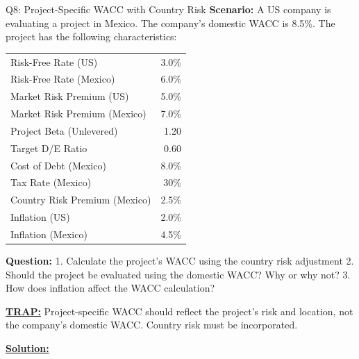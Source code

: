 \documentclass{beamer}
\renewcommand{\scriptsize}{\fontsize{6pt}{7pt}\selectfont}
\begin{document}
	\begin{frame}{Q8: Project-Specific WACC with Country Risk}
		\scriptsize
		\textbf{Scenario:} A US company is evaluating a project in Mexico. The company's domestic WACC is 8.5\%. The project has the following characteristics:
		
		\begin{tabular}{lr}
			Risk-Free Rate (US) & 3.0\% \\
			Risk-Free Rate (Mexico) & 6.0\% \\
			Market Risk Premium (US) & 5.0\% \\
			Market Risk Premium (Mexico) & 7.0\% \\
			Project Beta (Unlevered) & 1.20 \\
			Target D/E Ratio & 0.60 \\
			Cost of Debt (Mexico) & 8.0\% \\
			Tax Rate (Mexico) & 30\% \\
			Country Risk Premium (Mexico) & 2.5\% \\
			Inflation (US) & 2.0\% \\
			Inflation (Mexico) & 4.5\% \\
		\end{tabular}
		
		\textbf{Question:}
		1. Calculate the project's WACC using the country risk adjustment
		2. Should the project be evaluated using the domestic WACC? Why or why not?
		3. How does inflation affect the WACC calculation?
		
		\vspace{2pt}
		\underline{\textbf{TRAP:}} Project-specific WACC should reflect the project's risk and location, not the company's domestic WACC. Country risk must be incorporated.
		
		\vspace{4pt}
		\underline{\textbf{Solution:}}
	\end{frame}
	
\end{document}
